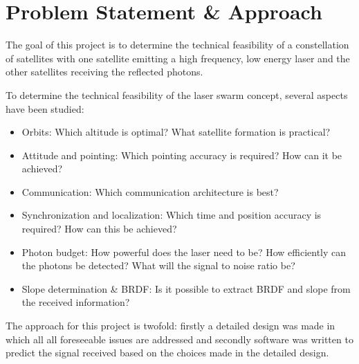 \section*{Problem Statement \& Approach}
The goal of this project is to determine the technical feasibility of a constellation of satellites with one satellite emitting a high frequency, low energy laser and the other satellites receiving the reflected photons.

To determine the technical feasibility of the laser swarm concept, several aspects have been studied:

\begin{itemize}
\item Orbits: Which altitude is optimal? What satellite formation is practical?
\item Attitude and pointing: Which pointing accuracy is required? How can it be achieved?
\item Communication: Which communication architecture is best?
\item Synchronization and localization: Which time and position accuracy is required? How can this be achieved?
\item Photon budget: How powerful does the laser need to be? How efficiently can the photons be detected? What will the signal to noise ratio be?
\item Slope determination \& \ac{BRDF}: Is it possible to extract \ac{BRDF} and slope from the received information?
\end{itemize}

The approach for this project is twofold: firstly a detailed design was made in which all all foreseeable issues are addressed and secondly software was written to predict the signal received based on the choices made in the detailed design.